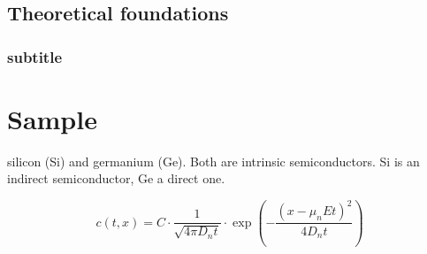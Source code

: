 \subsection{Theoretical foundations}
\subsubsection{subtitle}
\section{Sample}


silicon (Si) and germanium (Ge). 
Both are intrinsic semiconductors. 
Si is an indirect semiconductor, Ge a direct one. 


\begin{equation}
    c(t, x) = C \cdot \frac{1}{\sqrt{4 \pi D_n t}} 
    \cdot \exp\left( -\frac{\left( x - \mu_n E t \right)^2}{4 D_n t} \right)
    \label{eq:c_t_x}
\end{equation}

